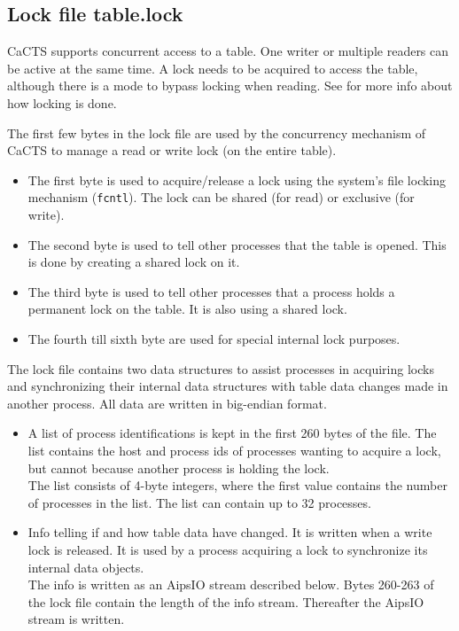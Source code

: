 \subsection{Lock file table.lock}
CaCTS supports concurrent access to a table. One writer or multiple
readers can be active at the same time. A lock needs to be acquired to
access the table, although there is a mode to bypass locking when
reading. See 
for more info about how locking is done.

The first few bytes in the lock file are used by the concurrency
mechanism of CaCTS to manage a read or write lock (on the entire table).
\begin{itemize}
\item The first byte is used to acquire/release a lock using the system's
  file locking mechanism (\texttt{fcntl}). The lock can be shared (for
  read) or exclusive (for write).
\item The second byte is used to tell other processes that the table
  is opened. This is done by creating a shared lock on it.
\item The third byte is used to tell other processes that a process holds
  a permanent lock on the table. It is also using a shared lock.
\item The fourth till sixth byte are used for special internal lock purposes.
\end{itemize}

The lock file contains two data structures to assist processes in
acquiring locks and synchronizing their internal data structures with
table data changes made in another process.
All data are written in big-endian format.
\begin{itemize}
\item A list of process identifications is kept in the first
  260 bytes of the file. The list contains the host and process ids of
  processes wanting to acquire a  lock, but cannot because
  another process is holding the lock.
  \\The list consists of 4-byte integers, where the first value contains
  the number of processes in the list. The list can contain up  to 32 processes.
\item Info telling if and how table data have changed. It is written
  when a write lock is released. It is used by a process
  acquiring a lock to synchronize its internal data objects.
  \\The info is written as an AipsIO stream described below. Bytes
  260-263 of the lock file contain the length of the info
  stream. Thereafter the AipsIO stream is written. 
\end{itemize}

